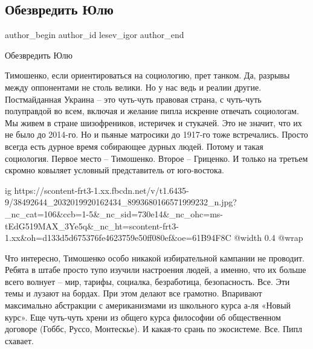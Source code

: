  
 
 
 
 
 
\subsection{Обезвредить Юлю}
\label{sec:04_08_2018.fb.lesev_igor.1.obezvredit_julju}
 
\ifcmt
 author_begin
   author_id lesev_igor
 author_end
\fi

Обезвредить Юлю

Тимошенко, если ориентироваться на социологию, прет танком. Да, разрывы между
оппонентами не столь велики. Но у нас ведь и реалии другие. Постмайданная
Украина – это чуть-чуть правовая страна, с чуть-чуть полуправдой во всем,
включая и желание пипла искренне отвечать социологам. Мы живем в стране
шизофреников, истеричек и стукачей. Это не значит, что их не было до 2014-го.
Но и пьяные матросики до 1917-го тоже встречались. Просто всегда есть дурное
время собирающее дурных людей. Потому и такая социология. Первое место –
Тимошенко. Второе – Гриценко. И только на третьем скромно ковыляет условный
представитель от юго-востока.

\ifcmt
  ig https://scontent-frt3-1.xx.fbcdn.net/v/t1.6435-9/38492644_2032019920162434_8993680166571999232_n.jpg?_nc_cat=106&ccb=1-5&_nc_sid=730e14&_nc_ohc=ms-tEdG519MAX_3Ye5q&_nc_ht=scontent-frt3-1.xx&oh=d133d5d675376fe4623759e50ff080ef&oe=61B94F8C
  @width 0.4
  @wrap 
\fi

Что интересно, Тимошенко особо никакой избирательной кампании не проводит.
Ребята в штабе просто тупо изучили настроения людей, а именно, что их больше
всего волнует – мир, тарифы, социалка, безработица, безопасность. Все. Эти темы
и лузают на бордах. При этом делают все грамотно. Впаривают максимально
абстракции с американизмами из школьного курса а-ля «Новый курс». Еще чуть-чуть
хрени из общего курса философии об общественном договоре (Гоббс, Руссо,
Монтескье). И какая-то срань по экосистеме. Все. Пипл схавает.

